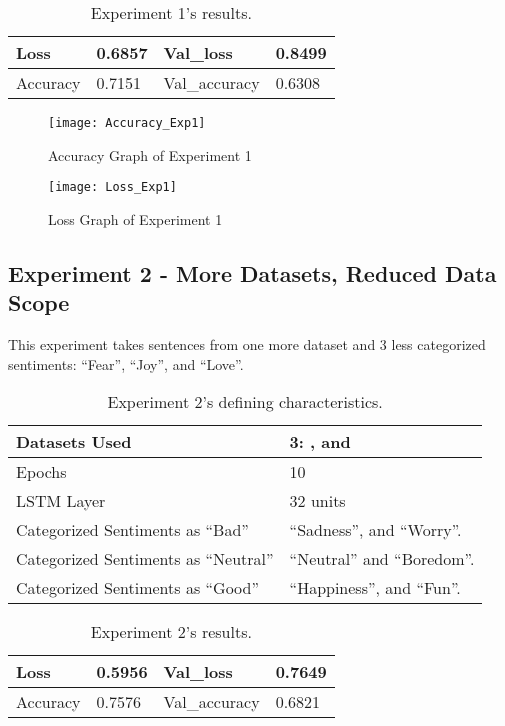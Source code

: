 \begin{table}[!bh]
	\caption{Experiment 1's results.}
	\vspace{0.5cm}
	\centering
	\begin{tabular}[t]{|l|l|l|l|}
	\hline
		Loss & 0.6857 & Val\_loss & 0.8499
	\\ \hline
		Accuracy & 0.7151 & Val\_accuracy & 0.6308
	\\ \hline
	\end{tabular}
\end{table}


\begin{figure}[!h]
	\centering
	\texttt{[image: Accuracy\_Exp1]}
	\caption{Accuracy Graph of Experiment 1}
	\label{fig:accuracy_exp1}
	\texttt{[image: Loss\_Exp1]}
	\caption{Loss Graph of Experiment 1}
	\label{fig:loss_exp1}
\end{figure}
\pagebreak

\subsection{Experiment 2 - More Datasets, Reduced Data Scope}
\label{exp2}
This experiment takes sentences from one more dataset and 3 less categorized sentiments: ``Fear'', ``Joy'', and ``Love''.
\begin{table}[!th]
	\caption{Experiment 2's defining characteristics.}
	\vspace{0.5cm}
	\centering
	\begin{tabular}[t]{|l|l|}
	\hline
		Datasets Used & \makecell{3: \citet{d1}, \citet{d2} and\\ \citet{d3}}
	\\ \hline
		Epochs & 10
	\\ \hline
		LSTM Layer & 32 units
	\\ \hline
		Categorized Sentiments as ``Bad'' & ``Sadness'', and ``Worry''.
	\\ \hline	
		 Categorized Sentiments as ``Neutral'' & ``Neutral'' and ``Boredom''.
	\\ \hline	
		Categorized Sentiments as ``Good'' & ``Happiness'', and ``Fun''.
	\\ \hline
	\end{tabular}
\end{table}

\begin{table}[!bh]
	\caption{Experiment 2's results.}
	\vspace{0.5cm}
	\centering
	\begin{tabular}[t]{|l|l|l|l|}
	\hline
		Loss & 0.5956 & Val\_loss & 0.7649
	\\ \hline
		Accuracy & 0.7576 & Val\_accuracy & 0.6821
	\\ \hline
	\end{tabular}
\end{table}


